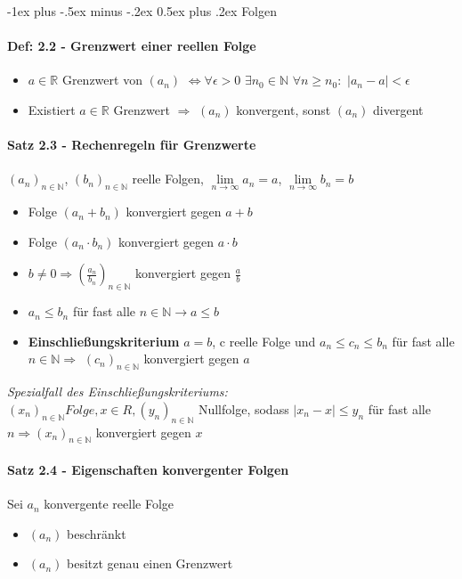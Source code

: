 \documentclass[paper=a4,paper=landscape, fontsize=6pt,DIV=25, twoside]{scrartcl}
\makeatletter
\newcommand{\real}{{\mathbb{R}}}
\newcommand{\nat}{\mathbb{N}}
\renewcommand{\section}{\@startsection{section}{1}{0mm}%
                                {-1ex plus -.5ex minus -.2ex}%
                                {0.5ex plus .2ex}%
                                {\normalfont\large\bfseries}}
\makeatother
\begin{document}
\begin{multicols*}{4}

	\section{Folgen}
		\paragraph{Def: 2.2 - Grenzwert einer reellen Folge}
			\begin{itemize}[noitemsep,nolistsep]
				\item $a \in \real$ Grenzwert von $(a_n)$ $\Leftrightarrow \forall \epsilon > 0$ $\exists n_0 \in \nat$ $\forall n \geq n_0:$ $|a_n - a| < \epsilon$
				\item Existiert $a \in \real$ Grenzwert $\Rightarrow$ $(a_n)$ konvergent, sonst $(a_n)$ divergent
			\end{itemize}
		\paragraph{Satz 2.3 - Rechenregeln für Grenzwerte}
			$(a_n)_{n \in \nat}$, $(b_n)_{n \in \nat}$ reelle Folgen, $\lim\limits_{n \rightarrow \infty} a_n = a$, $\lim\limits_{n \rightarrow \infty} b_n = b$
			\begin{itemize}[noitemsep,nolistsep]
				\item Folge $(a_n + b_n)$ konvergiert gegen $a+b$
				\item Folge $(a_n \cdot b_n)$ konvergiert gegen $a \cdot b$
				\item $b \neq 0 \Rightarrow (\frac{a_n}{b_n})_{n \in \nat}$ konvergiert gegen $\frac{a}{b}$ 
				\item $a_n \leq b_n$ für fast alle $n \in \nat \rightarrow a \leq b$
				\item \textbf{Einschließungskriterium} $a=b$, c reelle Folge und $a_n \leq c_n \leq b_n$ für fast alle $n \in \nat \Rightarrow$ $(c_n)_{n \in \nat}$ konvergiert gegen $a$
			\end{itemize}
		\textit{Spezialfall des Einschließungskriteriums:}\\$(x_n)_{n \in \nat} Folge, x \in R, (y_n)_{n \in \nat}$ Nullfolge, sodass $|x_n -x| \leq y_n$ für fast alle $n \Rightarrow (x_n)_{n \in \nat}$ konvergiert gegen $x$
		\paragraph{Satz 2.4 - Eigenschaften konvergenter Folgen}
		Sei $a_n$ konvergente reelle Folge
		\begin{itemize}[noitemsep,nolistsep]
			\item $(a_n)$ beschränkt
			\item $(a_n)$ besitzt genau einen Grenzwert
		\end{itemize}

\end{multicols*}
\end{document}
